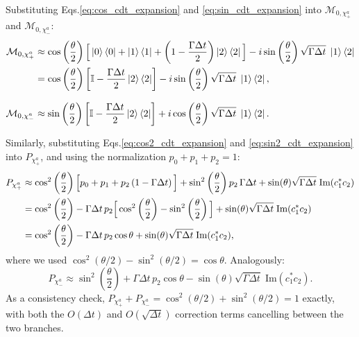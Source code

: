 \documentclass[a4paper,12pt]{article}
\begin{document}
Substituting Eqs.\ref{eq:cos_cdt_expansion} and \ref{eq:sin_cdt_expansion} into 
$\mathcal{M}_{0,\chi_{+}^{a}}$ and $\mathcal{M}_{0,\chi_{-}^{a}}$:
\begin{align}
	\mathcal{M}_{0, \chi_{+}^{a}} &\approx \cos\left(\frac{\theta}{2}\right) 
	\Big[ \ket{0}\bra{0} + \ket{1}\bra{1} + \left(1-\frac{\Gamma\Delta t}{2}\right)\ket{2}\bra{2} \Big] 
	- i \sin\left(\frac{\theta}{2}\right) \sqrt{\Gamma\Delta t}\; \ket{1}\bra{2} \notag \\
	&= \cos\left(\frac{\theta}{2}\right) \left[ \mathbb{I} - \frac{\Gamma\Delta t}{2}\ket{2}\bra{2} \right] 
	- i \sin\left(\frac{\theta}{2}\right) \sqrt{\Gamma\Delta t}\; \ket{1}\bra{2}, 
	\label{eq:M0_chiplus_expanded} \\[8pt]
	\mathcal{M}_{0, \chi_{-}^{a}} &\approx \sin\left(\frac{\theta}{2}\right) 
	\left[ \mathbb{I} - \frac{\Gamma\Delta t}{2}\ket{2}\bra{2} \right] 
	+ i \cos\left(\frac{\theta}{2}\right) \sqrt{\Gamma\Delta t}\; \ket{1}\bra{2}. 
	\label{eq:M0_chiminus_expanded}
\end{align}

Similarly, substituting Eqs.\ref{eq:cos2_cdt_expansion} and \ref{eq:sin2_cdt_expansion} 
into $P_{\chi_{+}^{a}}$, and using the normalization $p_{0}+p_{1}+p_{2}=1$:
\begin{align}
	P_{\chi_{+}^{a}} &\approx \cos^{2}\left(\frac{\theta}{2}\right) 
	\Big[ p_{0}+p_{1}+p_{2}\left(1-\Gamma\Delta t\right) \Big] 
	+ \sin^{2}\left(\frac{\theta}{2}\right) p_{2}\,\Gamma\Delta t 
	+ \sin(\theta)\sqrt{\Gamma\Delta t}\;\text{Im}(c_{1}^{*}c_{2}) \notag \\
	&= \cos^{2}\left(\frac{\theta}{2}\right) 
	- \Gamma\Delta t\, p_{2}\Big[\cos^{2}\left(\frac{\theta}{2}\right)-\sin^{2}\left(\frac{\theta}{2}\right)\Big] 
	+ \sin(\theta)\sqrt{\Gamma\Delta t}\;\text{Im}(c_{1}^{*}c_{2}) \notag \\
	&= \cos^{2}\left(\frac{\theta}{2}\right) - \Gamma\Delta t\, p_{2}\cos\theta 
	+ \sin(\theta)\sqrt{\Gamma\Delta t}\;\text{Im}(c_{1}^{*}c_{2}), 
	\label{eq:P_chiplus_expanded}
\end{align}
where we used $\cos^{2}(\theta/2)-\sin^{2}(\theta/2)=\cos\theta$. Analogously:
\begin{equation}
	P_{\chi_{-}^{a}} \approx \sin^{2}\left(\frac{\theta}{2}\right) + \Gamma\Delta t\, p_{2}\cos\theta 
	- \sin(\theta)\sqrt{\Gamma\Delta t}\;\text{Im}(c_{1}^{*}c_{2}).
	\label{eq:P_chiminus_expanded}
\end{equation}
As a consistency check, $P_{\chi_{+}^{a}}+P_{\chi_{-}^{a}} = \cos^{2}(\theta/2)+\sin^{2}(\theta/2) = 1$ 
exactly, with both the $O(\Delta t)$ and $O(\sqrt{\Delta t})$ correction terms cancelling between the two branches.
\end{document}
